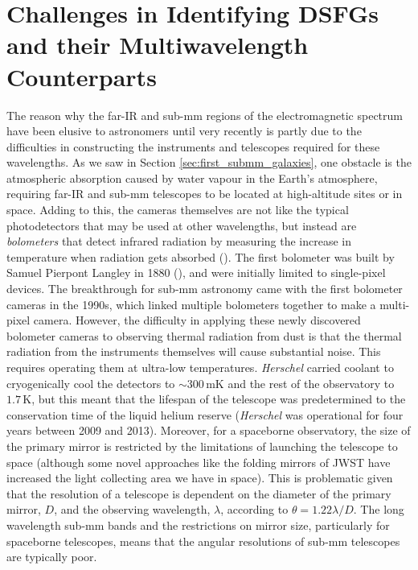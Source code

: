 \section{Challenges in Identifying DSFGs and their Multiwavelength Counterparts}
\label{sec:challenges}

The reason why the far-IR and sub-mm regions of the electromagnetic spectrum have been elusive to astronomers until very recently is partly due to the difficulties in constructing the instruments and telescopes required for these wavelengths. As we saw in Section \ref{sec:first_submm_galaxies}, one obstacle is the atmospheric absorption caused by water vapour in the Earth's atmosphere, requiring far-IR and sub-mm telescopes to be located at high-altitude sites or in space. Adding to this, the cameras themselves are not like the typical photodetectors that may be used at other wavelengths, but instead are \textit{bolometers} that detect infrared radiation by measuring the increase in temperature when radiation gets absorbed (\citealt{Woodcraft_2009}). The first bolometer was built by Samuel Pierpont Langley in 1880 (\citealt{Langley_1880}), and were initially limited to single-pixel devices. The breakthrough for sub-mm astronomy came with the first bolometer cameras in the 1990s, which linked multiple bolometers together to make a multi-pixel camera. However, the difficulty in applying these newly discovered bolometer cameras to observing thermal radiation from dust is that the thermal radiation from the instruments themselves will cause substantial noise. This requires operating them at ultra-low temperatures. \textit{Herschel} carried coolant to cryogenically cool the detectors to $\sim 300\,$mK and the rest of the observatory to $1.7\,$K, but this meant that the lifespan of the telescope was predetermined to the conservation time of the liquid helium reserve (\textit{Herschel} was operational for four years between 2009 and 2013). Moreover, for a spaceborne observatory, the size of the primary mirror is restricted by the limitations of launching the telescope to space (although some novel approaches like the folding mirrors of JWST have increased the light collecting area we have in space). This is problematic given that the resolution of a telescope is dependent on the diameter of the primary mirror, $D$, and the observing wavelength, $\lambda$, according to $\theta = 1.22\lambda/D$. The long wavelength sub-mm bands and the restrictions on mirror size, particularly for spaceborne telescopes, means that the angular resolutions of sub-mm telescopes are typically poor.

